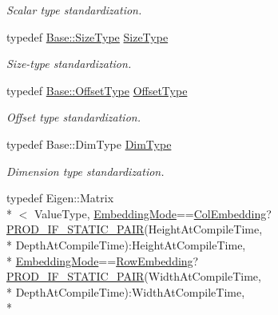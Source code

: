 \begin{DoxyCompactItemize}
\begin{DoxyCompactList}\small\item\em Scalar type standardization. \end{DoxyCompactList}\item 
typedef \hyperlink{classffnn_1_1layer_1_1internal_1_1_interface_af0567642f60c65b5e87067226a54174b}{Base\-::\-Size\-Type} \hyperlink{classffnn_1_1layer_1_1_receptive_volume_a3e9853931ec53fae609bb3fef11fa325}{Size\-Type}
\begin{DoxyCompactList}\small\item\em Size-\/type standardization. \end{DoxyCompactList}\item 
typedef \hyperlink{classffnn_1_1layer_1_1internal_1_1_interface_adc5bb454329ebd51ac26579a43c006fd}{Base\-::\-Offset\-Type} \hyperlink{classffnn_1_1layer_1_1_receptive_volume_a1844c5ef59193938758e778eb0530ba6}{Offset\-Type}
\begin{DoxyCompactList}\small\item\em Offset type standardization. \end{DoxyCompactList}\item 
typedef Base\-::\-Dim\-Type \hyperlink{classffnn_1_1layer_1_1_receptive_volume_ab0bd7607040aa08bf9cdfcc30e2794ef}{Dim\-Type}
\begin{DoxyCompactList}\small\item\em Dimension type standardization. \end{DoxyCompactList}\item 
typedef Eigen\-::\-Matrix\\*
$<$ Value\-Type, \hyperlink{namespaceffnn_1_1layer_a254f16beba4fb335d935e9b43bb9e69a}{Embedding\-Mode}==\hyperlink{namespaceffnn_1_1layer_a254f16beba4fb335d935e9b43bb9e69aaede1065f5863208cae7e55561966a182}{Col\-Embedding}?\hyperlink{receptive__volume_8h_a74feffebf310dd34521adc2adcaf64c9}{P\-R\-O\-D\-\_\-\-I\-F\-\_\-\-S\-T\-A\-T\-I\-C\-\_\-\-P\-A\-I\-R}(Height\-At\-Compile\-Time, \\*
Depth\-At\-Compile\-Time)\-:Height\-At\-Compile\-Time, \\*
\hyperlink{namespaceffnn_1_1layer_a254f16beba4fb335d935e9b43bb9e69a}{Embedding\-Mode}==\hyperlink{namespaceffnn_1_1layer_a254f16beba4fb335d935e9b43bb9e69aa56bf723aeae4562f2fe05ae5e675da92}{Row\-Embedding}?\hyperlink{receptive__volume_8h_a74feffebf310dd34521adc2adcaf64c9}{P\-R\-O\-D\-\_\-\-I\-F\-\_\-\-S\-T\-A\-T\-I\-C\-\_\-\-P\-A\-I\-R}(Width\-At\-Compile\-Time, \\*
Depth\-At\-Compile\-Time)\-:Width\-At\-Compile\-Time, \\*

\end{DoxyCompactItemize}
